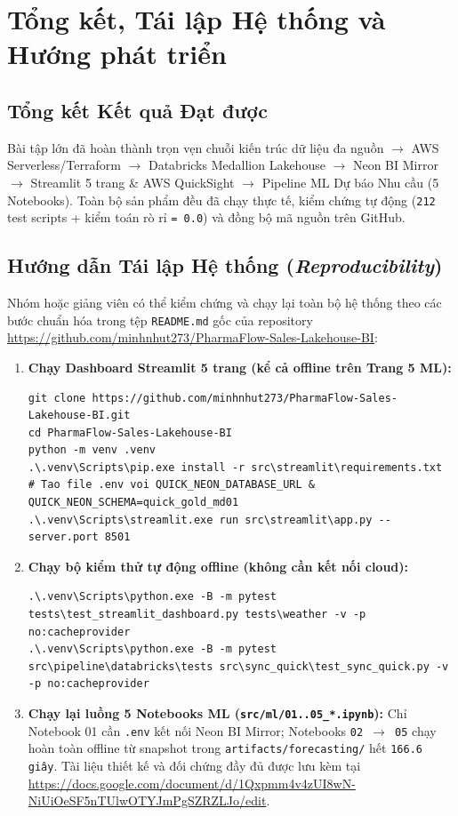 \chapter{Tổng kết, Tái lập Hệ thống và Hướng phát triển}
\label{ch:tongket_tailap}

\section{Tổng kết Kết quả Đạt được}
Bài tập lớn đã hoàn thành trọn vẹn chuỗi kiến trúc dữ liệu đa nguồn $\rightarrow$ AWS Serverless/Terraform $\rightarrow$ Databricks Medallion Lakehouse $\rightarrow$ Neon BI Mirror $\rightarrow$ Streamlit 5 trang \& AWS QuickSight $\rightarrow$ Pipeline ML Dự báo Nhu cầu (5 Notebooks). Toàn bộ sản phẩm đều đã chạy thực tế, kiểm chứng tự động (\texttt{212} test scripts + kiểm toán rò rỉ \texttt{= 0.0}) và đồng bộ mã nguồn trên GitHub.

\section{Hướng dẫn Tái lập Hệ thống (\textit{Reproducibility})}
Nhóm hoặc giảng viên có thể kiểm chứng và chạy lại toàn bộ hệ thống theo các bước chuẩn hóa trong tệp \texttt{README.md} gốc của repository \url{https://github.com/minhnhut273/PharmaFlow-Sales-Lakehouse-BI}:
\begin{enumerate}[leftmargin=1.5em]
  \item \textbf{Chạy Dashboard Streamlit 5 trang (kể cả offline trên Trang 5 ML):}
\begin{lstlisting}[basicstyle=\ttfamily\footnotesize,frame=single,breaklines=true]
git clone https://github.com/minhnhut273/PharmaFlow-Sales-Lakehouse-BI.git
cd PharmaFlow-Sales-Lakehouse-BI
python -m venv .venv
.\.venv\Scripts\pip.exe install -r src\streamlit\requirements.txt
# Tao file .env voi QUICK_NEON_DATABASE_URL & QUICK_NEON_SCHEMA=quick_gold_md01
.\.venv\Scripts\streamlit.exe run src\streamlit\app.py --server.port 8501
\end{lstlisting}
  \item \textbf{Chạy bộ kiểm thử tự động offline (không cần kết nối cloud):}
\begin{lstlisting}[basicstyle=\ttfamily\footnotesize,frame=single,breaklines=true]
.\.venv\Scripts\python.exe -B -m pytest tests\test_streamlit_dashboard.py tests\weather -v -p no:cacheprovider
.\.venv\Scripts\python.exe -B -m pytest src\pipeline\databricks\tests src\sync_quick\test_sync_quick.py -v -p no:cacheprovider
\end{lstlisting}
  \item \textbf{Chạy lại luồng 5 Notebooks ML (\texttt{src/ml/01..05\_*.ipynb}):} Chỉ Notebook 01 cần \texttt{.env} kết nối Neon BI Mirror; Notebooks \texttt{02 $\rightarrow$ 05} chạy hoàn toàn offline từ snapshot trong \texttt{artifacts/forecasting/} hết \texttt{166.6 giây}. Tài liệu thiết kế và đối chứng đầy đủ được lưu kèm tại \url{https://docs.google.com/document/d/1Qxpmm4v4zUI8wN-NiUiOeSF5nTUlwOTYJmPgSZRZLJo/edit}.
\end{enumerate}

